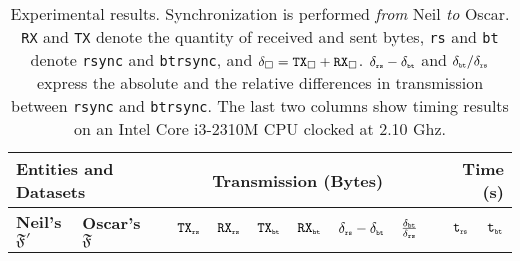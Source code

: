 \documentclass[twoside,envcountsame,runningheads]{llncs}
\newcommand{\btrsync}{\texttt{btrsync}\xspace}
\newcommand{\rsync}{\texttt{rsync}\xspace}
\def\fullversion{0} %
\newcommand{\full}[2]{%
\ifnum\fullversion=1%
#1%
\else%
#2%
\fi}
\begin{document}

\begin{table}[t]
  \centering
  \caption{Experimental results. \scriptsize Synchronization is performed \textit{from} Neil \textit{to} Oscar. {\tt RX} and {\tt TX} denote the quantity of received and sent bytes, {\tt rs} and {\tt bt} denote {\tt rsync} and {\tt btrsync}, and $\delta_{\square}=\mbox{{\tt TX}}_{\square}+\mbox{{\tt RX}}_{\square}$. $\delta_{\mbox{{\tiny {\tt rs}}}}-\delta_{\mbox{{\tiny {\tt bt}}}}$ and ${\delta_{\mbox{{\tiny {\tt bt}}}}}/{\delta_{\mbox{{\tiny {\tt rs}}}}}$ express the absolute and the relative differences in transmission between \rsync and \btrsync. The last two columns show timing results on an Intel Core i3-2310M CPU clocked at 2.10 Ghz.}
  \label{tab:results}
  \setlength{\tabcolsep}{3pt}
  \begin{tabularx}{\textwidth}{ll X r r r r r r X r r }
    \toprule
    \multicolumn{2}{l}{\bf Entities and Datasets %
}&  &  \multicolumn{6}{c}{\bf Transmission (Bytes)} &  & \multicolumn{2}{r}{\bf Time (s)} \\
    \midrule {\bf Neil's $\mathfrak{F}'$}  & {\bf Oscar's $\mathfrak{F}$}
    & & $\mbox{{\tt TX}}_{\mbox{{\tiny {\tt rs}}}}$ & $\mbox{{\tt RX}}_{\mbox{{\tiny {\tt rs}}}}$  & $\mbox{{\tt TX}}_{\mbox{{\tiny {\tt bt}}}}$  & $\mbox{{\tt RX}}_{\mbox{{\tiny {\tt bt}}}}$  & $\delta_{\mbox{{\tiny {\tt rs}}}}-\delta_{\mbox{{\tiny {\tt bt}}}}$ &
    $\frac{\delta_{\mbox{{\tiny {\tt bt}}}}}{\delta_{\mbox{{\tiny {\tt rs}}}}}$ & & $\mbox{{\tt t}}_{\mbox{{\tiny {\tt rs}}}}$ & $\mbox{{\tt t}}_{\mbox{{\tiny {\tt bt}}}}$ \\\midrule
    
    \bottomrule
  \end{tabularx}\smallskip
\end{table}
\end{document}
